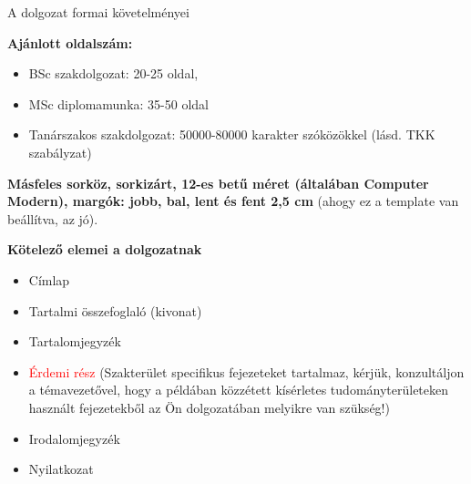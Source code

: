 \documentclass[a4paper,12pt]{report}
\date{today}
\theoremstyle{definition}
\theoremstyle{remark}
\begin{document}
\thispagestyle{empty}

\begin{center}
   {\Large A dolgozat formai követelményei}   
\end{center}

\vspace{1 cm}

{\bf Ajánlott oldalszám:}
\begin{itemize}
\item BSc szakdolgozat: 20-25 oldal, 
\item MSc diplomamunka: 35-50 oldal
\item Tanárszakos szakdolgozat: 50000-80000 karakter szóközökkel (lásd. TKK szabályzat)
\end{itemize}

\vspace{1 cm}

{\bf Másfeles sorköz, sorkizárt, 12-es betű méret (általában Computer Modern), margók: jobb, bal, lent és fent 2,5 cm} (ahogy ez a template van beállítva, az jó).

\vspace{1 cm}

{\bf Kötelező elemei a dolgozatnak}
\begin{itemize}
   \item Címlap
   \item Tartalmi összefoglaló (kivonat)
   \item Tartalomjegyzék
   \item \textcolor{red}{Érdemi rész}
(Szakterület specifikus fejezeteket tartalmaz, kérjük, konzultáljon a témavezetővel, hogy a példában közzétett kísérletes tudományterületeken használt fejezetekből az Ön dolgozatában melyikre van szükség!)
\item Irodalomjegyzék
\item Nyilatkozat
\end{itemize}
\newpage




\thispagestyle{empty}
\end{document}
